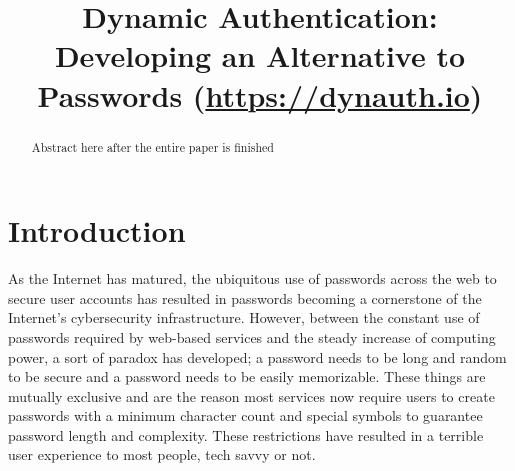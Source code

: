 \documentclass[conference]{IEEEtran}
\begin{document}
\title{Dynamic Authentication: Developing an Alternative to Passwords (\url{https://dynauth.io})\\}

\author{
\and
{}
\and
{}
}

\maketitle

\begin{abstract}
	Abstract here after the entire paper is finished
\end{abstract}


\section{Introduction}
	As the Internet has matured, the ubiquitous use of passwords across the web to secure user accounts has resulted in passwords becoming a cornerstone of the Internet’s cybersecurity infrastructure. However, between the constant use of passwords required by web-based services and the steady increase of computing power, a sort of paradox has developed; a password needs to be long and random to be secure and a password needs to be easily memorizable. These things are mutually exclusive and are the reason most services now require users to create passwords with a minimum character count and special symbols to guarantee password length and complexity. These restrictions have resulted in a terrible user experience to most people, tech savvy or not.
	
\end{document}
